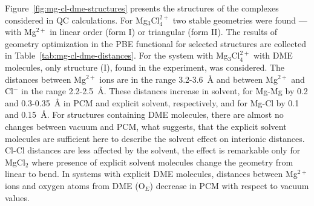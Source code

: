 Figure~\ref{fig:mg-cl-dme-structures} presents the structures of the complexes considered in QC calculations. For Mg$_3$Cl$_4^{2+}$ two stable geometries were found --- with Mg$^{2+}$ in linear order (form I) or triangular (form II). The results of geometry optimization in the PBE functional for selected structures are collected in Table~\ref{tab:mg-cl-dme-distances}. For the system with Mg$_3$Cl$_4^{2+}$ with DME molecules, only structure (I), found in the experiment, was considered. The distances between Mg$^{2+}$ ions are in the range 3.2-3.6~{\AA} and between Mg$^{2+}$ and Cl$^{-}$ in the range 2.2-2.5~{\AA}. These distances increase in solvent, for Mg-Mg by 0.2 and 0.3-0.35~{\AA} in PCM and explicit solvent, respectively, and for Mg-Cl by 0.1 and 0.15~{\AA}. For structures containing DME molecules, there are almost no changes between vacuum and PCM, what suggests, that the explicit solvent molecules are sufficient here to describe the solvent effect on interionic distances. Cl-Cl distances are less affected by the solvent, the effect is remarkable only for MgCl$_2$ where presence of explicit solvent molecules change the geometry from linear to bend. In systems with explicit DME molecules, distances between Mg$^{2+}$ ions and oxygen atoms from DME (O$_E$) decrease in PCM with respect to vacuum values.

